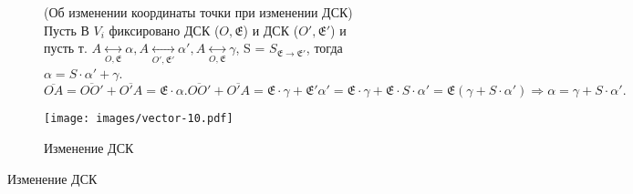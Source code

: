 \begin{figure}[h]
\begin{subfigure}[t!]{0.6\linewidth}
\begin{theorem}
	(Об изменении координаты точки при изменении ДСК) \\
	Пусть В \(V_i\) фиксировано ДСК (\(O, \mathfrak{E}\)) и ДСК (\(O', \mathfrak{E'}\)) и пусть т. \(A\underset{O, \mathfrak{E}}{\longleftrightarrow}\alpha, A\underset{O', \mathfrak{E'}}{\longleftrightarrow}\alpha', A\underset{O, \mathfrak{E}}{\longleftrightarrow}\gamma\), S = \(S_{\mathfrak{E}\to\mathfrak{E'}}\), тогда \(\alpha = S\cdot\alpha'+\gamma\). $\overline{OA} = \overline{OO'}+\overline{O'A} = \mathfrak{E}\cdot\alpha. \overline{OO'} + \overline{O'A} = \mathfrak{E}\cdot\gamma+\mathfrak{E'}\alpha' = \mathfrak{E}\cdot\gamma + \mathfrak{E}\cdot S\cdot \alpha' = \mathfrak{E}(\gamma+S\cdot\alpha')\Longrightarrow \alpha = \gamma+ S\cdot \alpha'.$
\end{theorem}
\end{subfigure}
\begin{subfigure}[b!]{0.4\linewidth}
	\centering
	\texttt{[image: images/vector-10.pdf]}
	\caption*{Изменение ДСК}
	\label{Vector10}
\end{subfigure}
\end{figure}

